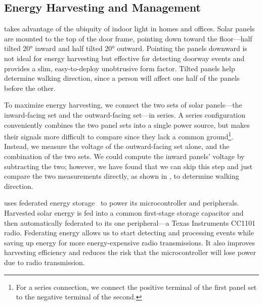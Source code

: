 \subsection{Energy Harvesting and Management}
\sysname takes advantage of the ubiquity of indoor light in homes and offices.
Solar panels are mounted to the top of the door frame, pointing down toward the floor---half tilted \ang{20} inward and half tilted \ang{20} outward.
Pointing the panels downward is not ideal for energy harvesting but effective for detecting doorway events and provides a slim, easy-to-deploy unobtrusive form factor.
Tilted panels help \sysname determine walking direction, since a person will affect one half of the panels before the other. 

To maximize energy harvesting, we connect the two sets of solar panels---the inward-facing set and the outward-facing set---in series.  
A series configuration conveniently combines the two panel sets into a single power source, but makes their signals more difficult to compare since they lack a common ground\footnote{For a series connection, we connect the positive terminal of the first panel set to the negative terminal of the second.}.
Instead, we measure the voltage of the outward-facing set alone, and the combination of the two sets.
We could compute the inward panels' voltage by subtracting the two; however, we have found that we can skip this step and just compare the two measurements directly, as shown in , to determine walking direction.


\sysname uses federated energy storage~\cite{jhester:ufop:sensys} to power its microcontroller and peripherals.
Harvested solar energy is fed into a common first-stage storage capacitor and then automatically federated to its one peripheral---a Texas Instruments CC1101 radio.
Federating energy allows us to start detecting and processing events while saving up energy for more energy-expensive radio transmissions.
It also improves harvesting efficiency and reduces the risk that the microcontroller will lose power due to radio transmission.

